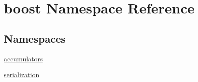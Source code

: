 \hypertarget{namespaceboost}{}\section{boost Namespace Reference}
\label{namespaceboost}
\subsection*{Namespaces}
\begin{DoxyCompactItemize}
\item 
 \hyperlink{namespaceboost_1_1accumulators}{accumulators}
\item 
 \hyperlink{namespaceboost_1_1serialization}{serialization}
\end{DoxyCompactItemize}
